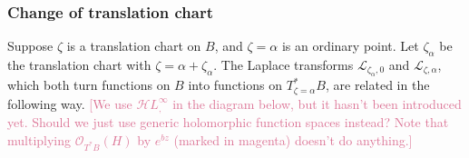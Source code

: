 \documentclass{article}
\newcommand{\singexp}[2]{\mathcal{H}L^\infty_{#1, #2}}
\newcommand{\laplace}{\mathcal{L}}
\theoremstyle{definition}
\theoremstyle{plain}
\begin{document}
\subsubsection{Change of translation chart}\label{sec:change-translation}
Suppose $\zeta$ is a translation chart on $B$, and $\zeta = \alpha$ is an ordinary point. Let $\zeta_\alpha$ be the translation chart with $\zeta = \alpha + \zeta_\alpha$. The Laplace transforms $\laplace_{\zeta_\alpha, 0}$ and $\laplace_{\zeta, \alpha}$, which both turn functions on $B$ into functions on $T^*_{\zeta = \alpha}B$, are related in the following way. \textcolor{PaleVioletRed}{[We use $\singexp{}{}$ in the diagram below, but it hasn't been introduced yet. Should we just use generic holomorphic function spaces instead? Note that multiplying $\mathcal{O}_{T^*B}(H)$ by $e^{bz}$ (marked in magenta) doesn't do anything.]}
\end{document}
